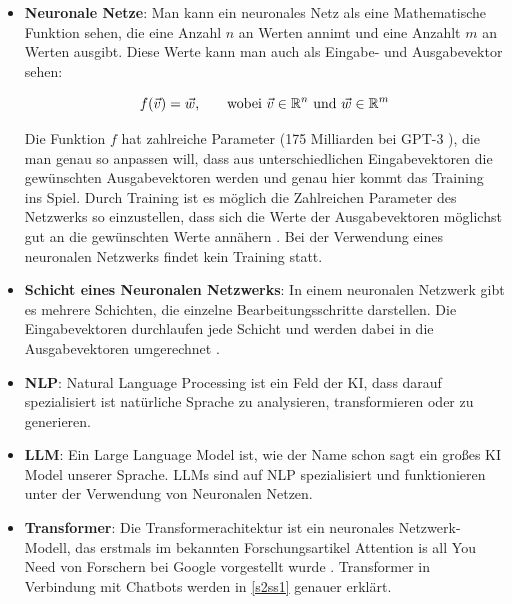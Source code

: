 	\begin{itemize}
		\item \textbf{Neuronale Netze}: Man kann ein neuronales Netz als eine Mathematische Funktion sehen,
		die eine Anzahl $n$ an Werten annimt und eine Anzahlt $m$ an Werten ausgibt. Diese Werte kann man auch als Eingabe-
		und Ausgabevektor sehen: 		
		
		\begin{equation*}	
			f(\vec{v}) = \vec{w}\textnormal{,\qquad wobei } \vec{v} \in \mathbb{R}^n \textnormal{ und } \vec{w} \in \mathbb{R}^m
		\end{equation*}  
		\vspace{0.0cm}
		
		Die Funktion $f$ hat zahlreiche Parameter (175 Milliarden bei GPT-3 \cite[S. 8]{openAI2020}), die man genau so 
		anpassen will, dass aus unterschiedlichen Eingabevektoren die gewünschten Ausgabevektoren werden und genau hier kommt 
		das Training ins Spiel. Durch Training ist es möglich die Zahlreichen Parameter des Netzwerks so einzustellen, dass 
		sich die Werte der Ausgabevektoren möglichst gut an die gewünschten Werte annähern \cite[S. 127f]{nielsen2015}. Bei
		der Verwendung eines neuronalen Netzwerks findet kein Training statt.   

		\item \textbf{Schicht eines Neuronalen Netzwerks}: In einem neuronalen Netzwerk gibt es mehrere Schichten, die einzelne
		Bearbeitungsschritte darstellen. Die Eingabevektoren durchlaufen jede Schicht und werden dabei in die Ausgabevektoren
		umgerechnet \cite[S. 4]{nielsen2015}. 
		
		\item \textbf{NLP}: Natural Language Processing ist ein Feld der KI, dass darauf spezialisiert ist natürliche 
		Sprache zu analysieren, transformieren oder zu generieren.  
		
		\item \textbf{LLM}: Ein Large Language Model ist, wie der Name schon sagt ein großes KI Model unserer Sprache.
		LLMs sind auf NLP spezialisiert und funktionieren unter der Verwendung von Neuronalen Netzen.

		\item \textbf{Transformer}: Die Transformerachitektur ist ein neuronales Netzwerk-Modell, das erstmals im 
		bekannten Forschungsartikel \glqq{}Attention is all You Need\grqq{} von Forschern bei Google vorgestellt wurde 
		\cite{vaswani2017}. Transformer in Verbindung mit Chatbots werden in \ref{s2ss1} genauer erklärt.
		

\end{itemize}
